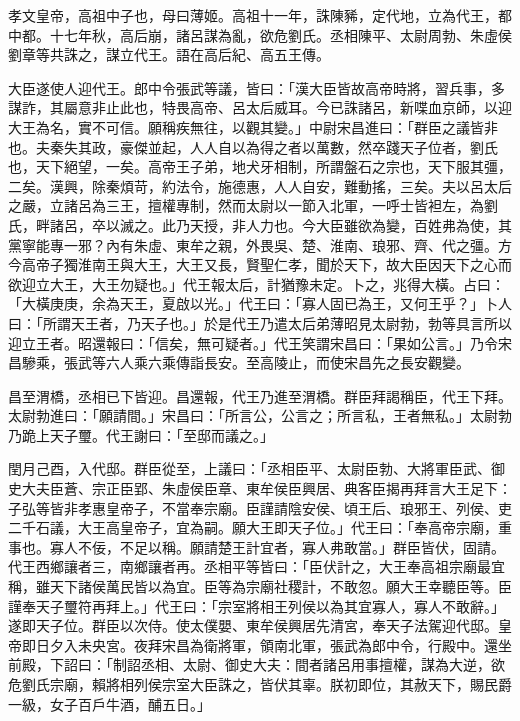 
\begin{pinyinscope}
孝文皇帝，高祖中子也，母曰薄姬。高祖十一年，誅陳豨，定代地，立為代王，都中都。十七年秋，高后崩，諸呂謀為亂，欲危劉氏。丞相陳平、太尉周勃、朱虛侯劉章等共誅之，謀立代王。語在高后紀、高五王傳。

大臣遂使人迎代王。郎中令張武等議，皆曰：「漢大臣皆故高帝時將，習兵事，多謀詐，其屬意非止此也，特畏高帝、呂太后威耳。今已誅諸呂，新喋血京師，以迎大王為名，實不可信。願稱疾無往，以觀其變。」中尉宋昌進曰：「群臣之議皆非也。夫秦失其政，豪傑並起，人人自以為得之者以萬數，然卒踐天子位者，劉氏也，天下絕望，一矣。高帝王子弟，地犬牙相制，所謂盤石之宗也，天下服其彊，二矣。漢興，除秦煩苛，約法令，施德惠，人人自安，難動搖，三矣。夫以呂太后之嚴，立諸呂為三王，擅權專制，然而太尉以一節入北軍，一呼士皆袒左，為劉氏，畔諸呂，卒以滅之。此乃天授，非人力也。今大臣雖欲為變，百姓弗為使，其黨寧能專一邪？內有朱虛、東牟之親，外畏吳、楚、淮南、琅邪、齊、代之彊。方今高帝子獨淮南王與大王，大王又長，賢聖仁孝，聞於天下，故大臣因天下之心而欲迎立大王，大王勿疑也。」代王報太后，計猶豫未定。卜之，兆得大橫。占曰：「大橫庚庚，余為天王，夏啟以光。」代王曰：「寡人固已為王，又何王乎？」卜人曰：「所謂天王者，乃天子也。」於是代王乃遣太后弟薄昭見太尉勃，勃等具言所以迎立王者。昭還報曰：「信矣，無可疑者。」代王笑謂宋昌曰：「果如公言。」乃令宋昌驂乘，張武等六人乘六乘傳詣長安。至高陵止，而使宋昌先之長安觀變。

昌至渭橋，丞相已下皆迎。昌還報，代王乃進至渭橋。群臣拜謁稱臣，代王下拜。太尉勃進曰：「願請間。」宋昌曰：「所言公，公言之；所言私，王者無私。」太尉勃乃跪上天子璽。代王謝曰：「至邸而議之。」

閏月己酉，入代邸。群臣從至，上議曰：「丞相臣平、太尉臣勃、大將軍臣武、御史大夫臣蒼、宗正臣郢、朱虛侯臣章、東牟侯臣興居、典客臣揭再拜言大王足下：子弘等皆非孝惠皇帝子，不當奉宗廟。臣謹請陰安侯、頃王后、琅邪王、列侯、吏二千石議，大王高皇帝子，宜為嗣。願大王即天子位。」代王曰：「奉高帝宗廟，重事也。寡人不佞，不足以稱。願請楚王計宜者，寡人弗敢當。」群臣皆伏，固請。代王西鄉讓者三，南鄉讓者再。丞相平等皆曰：「臣伏計之，大王奉高祖宗廟最宜稱，雖天下諸侯萬民皆以為宜。臣等為宗廟社稷計，不敢忽。願大王幸聽臣等。臣謹奉天子璽符再拜上。」代王曰：「宗室將相王列侯以為其宜寡人，寡人不敢辭。」遂即天子位。群臣以次侍。使太僕嬰、東牟侯興居先清宮，奉天子法駕迎代邸。皇帝即日夕入未央宮。夜拜宋昌為衛將軍，領南北軍，張武為郎中令，行殿中。還坐前殿，下詔曰：「制詔丞相、太尉、御史大夫：間者諸呂用事擅權，謀為大逆，欲危劉氏宗廟，賴將相列侯宗室大臣誅之，皆伏其辜。朕初即位，其赦天下，賜民爵一級，女子百戶牛酒，酺五日。」


\end{pinyinscope}
